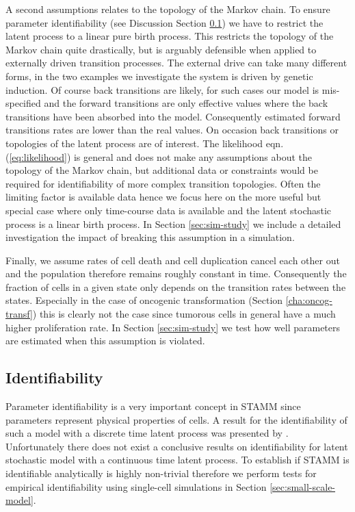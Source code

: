 \begin{figure}
{ }
  \label{fig:schematic-ass1}
\end{figure}

A second assumptions relates to the topology of the Markov chain. To ensure parameter identifiability (see Discussion Section \ref{sec:identifiability}) we have to restrict the latent process to a linear pure birth process. This restricts the topology of the Markov chain quite drastically, but is arguably defensible when applied to externally driven transition processes. The external drive can take many different forms, in the two examples we investigate the system is driven by genetic induction. Of course back transitions are likely, for such cases our model is mis-specified and the forward transitions are only effective values where the back transitions have been absorbed into the model. Consequently estimated forward transitions rates are lower than the real values. On occasion back transitions or topologies of the latent process are of interest.
The likelihood eqn. (\ref{eq:likelihood}) is general and does not make any assumptions about the topology of the Markov chain, but additional data or constraints would be required for identifiability of more complex transition topologies. Often the limiting factor is available data hence we focus here on the more useful but special case where only time-course data is available and the latent stochastic process is a linear birth process. In Section \ref{sec:sim-study} we include a detailed investigation the impact of breaking this assumption in a simulation. 

Finally, we assume rates of cell death and cell duplication cancel each other out and the population therefore remains roughly constant in time. Consequently the fraction of cells in a given state only depends on the transition rates between the states. Especially in the case of oncogenic transformation (Section \ref{cha:oncog-transf}) this is clearly not the case since tumorous cells in general have a much higher proliferation rate. In Section \ref{sec:sim-study} we test how well parameters are estimated when this assumption is violated.

\subsection{Identifiability}
\label{sec:identifiability}

Parameter identifiability is a very important concept in STAMM since parameters represent physical properties of cells. A result for the identifiability of such a model with a discrete time latent process was presented by \cite{Clifford:1977wa}. Unfortunately there does not exist a conclusive results on identifiability for latent stochastic model with a continuous time latent process. To establish if STAMM is identifiable analytically is highly non-trivial therefore we perform tests for empirical identifiability using single-cell simulations in Section \ref{sec:small-scale-model}. 

